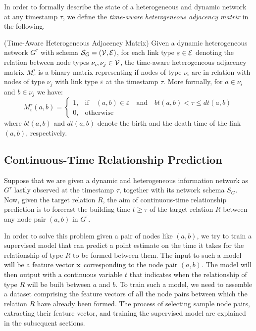In order to formally describe the state of a heterogeneous and dynamic network at any timestamp $\tau$, we define the \emph{time-aware heterogeneous adjacency matrix} in the following.
    
    \begin{definition}{(Time-Aware Heterogeneous Adjacency Matrix)}
        Given a dynamic heterogeneous network $G^\tau$ with schema $\mathcal{S}_G=(\mathcal{V}, \mathcal{E})$, for each link type $\varepsilon\in\mathcal{E}$ denoting the relation between node types $\nu_i,\nu_j\in\mathcal{V}$, the time-aware heterogeneous adjacency matrix $M^\tau_{\varepsilon}$ is a binary matrix representing if nodes of type $\nu_i$ are in relation with nodes of type $\nu_j$ with link type $\varepsilon$ at the timestamp $\tau$. More formally, for $a\in\nu_i$ and $b\in\nu_j$ we have:
        \[M^\tau_{\varepsilon}(a,b)=\begin{cases} 
        1, & \text{if}\quad(a,b)\in\varepsilon\quad\text{and}\quad bt(a,b) < \tau \le dt(a,b) \\
        0, & \text{otherwise}
        \end{cases}
        \]
        where $bt(a,b)$ and $dt(a,b)$ denote the birth and the death time of the link $(a,b)$, respectively.
    \end{definition}


\subsection{Continuous-Time Relationship Prediction}
Suppose that we are given a dynamic and heterogeneous information network as $G^{\tau}$ lastly observed at the timestamp $\tau$, together with its network schema $S_G$. Now, given the target relation $R$, the aim of continuous-time relationship prediction is to forecast the building time $t\ge \tau$ of the target relation $R$ between any node pair $(a,b)$ in $G^{\tau}$.


In order to solve this problem given a pair of nodes like $(a,b)$, we try to train a supervised model that can predict a point estimate on the time it takes for the relationship of type $R$ to be formed between them. The input to such a model will be a feature vector $\mathbf{x}$ corresponding to the node pair $(a,b)$. The model will then output with a continuous variable $t$ that indicates when the relationship of type $R$ will be built between $a$ and $b$. To train such a model, we need to assemble a dataset comprising the feature vectors of all the node pairs between which the relation $R$ have already been formed. The process of selecting sample node pairs, extracting their feature vector, and training the supervised model are explained in the subsequent sections. 




